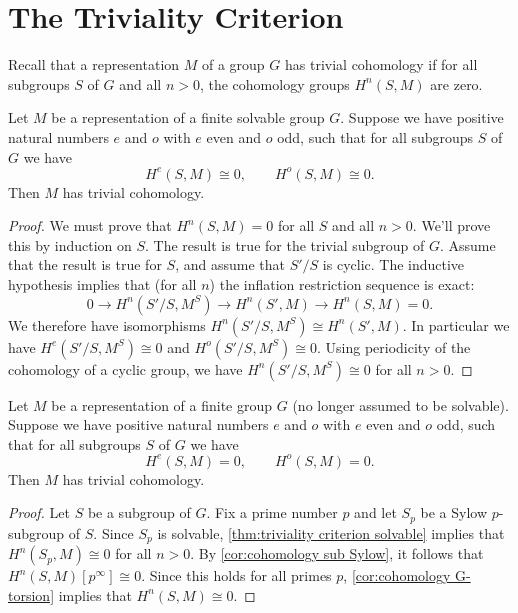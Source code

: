 \section{The Triviality Criterion}

Recall that a representation $M$ of a group $G$ has trivial cohomology if for all subgroups $S$ of
$G$ and all $n > 0$, the cohomology groups $H^{n}(S,M)$ are zero.

\begin{theorem} \label{thm:triviality criterion solvable}
	\leanok
	Let $M$ be a representation of a finite solvable group $G$.
	Suppose we have positive natural numbers $e$ and $o$ with $e$ even and $o$ odd,
	such that for all subgroups $S$ of $G$ we have
	\[
		H^e(S,M) \cong 0, \qquad H^o(S,M) \cong 0.
	\]
	Then $M$ has trivial cohomology.
\end{theorem}

\begin{proof}
	We must prove that $H^{n}(S,M) = 0$ for all $S$ and all $n > 0$.
	We'll prove this by induction on $S$. The result is true for the trivial subgroup of $G$.
	Assume that the result is true for $S$, and assume that $S' / S$ is cyclic.
	The inductive hypothesis implies that (for all $n$) the inflation restriction sequence is exact:
	\[
		0 \to H^{n} (S'/S, M^S) \to H^{n}(S' , M) \to H^{n}(S,M)= 0.
	\]
	We therefore have isomorphisms $H^{n} (S'/S, M^S) \cong H^{n}(S' , M)$.
	In particular we have $H^{e} (S'/S, M^S) \cong 0$ and $H^{o} (S'/S, M^S) \cong 0$.
	Using periodicity of the cohomology of a cyclic group, we have $H^{n}(S'/S,M^S) \cong 0$
	for all $n>0$.
\end{proof}

\begin{theorem} \label{thm:triviality criterion}
	\leanok
	Let $M$ be a representation of a finite group $G$ (no longer assumed to be solvable).
	Suppose we have positive natural numbers $e$ and $o$ with $e$ even and $o$ odd, such that for all
	subgroups $S$ of $G$ we have
	\[
		H^e(S,M) =0, \qquad H^o(S,M) = 0.
	\]
	Then $M$ has trivial cohomology.
\end{theorem}

\begin{proof}
	Let $S$ be a subgroup of $G$.
	Fix a prime number $p$ and let $S_p$ be a Sylow $p$-subgroup of $S$.
	Since $S_p$ is solvable, \ref{thm:triviality criterion solvable} implies that
	$H^n(S_p,M) \cong 0$ for all $n > 0$.
	By \ref{cor:cohomology sub Sylow}, it follows that $H^n(S,M)[p^\infty] \cong 0$.
	Since this holds for all primes $p$,
	\ref{cor:cohomology G-torsion} implies that $H^n(S,M) \cong 0$.
\end{proof}

